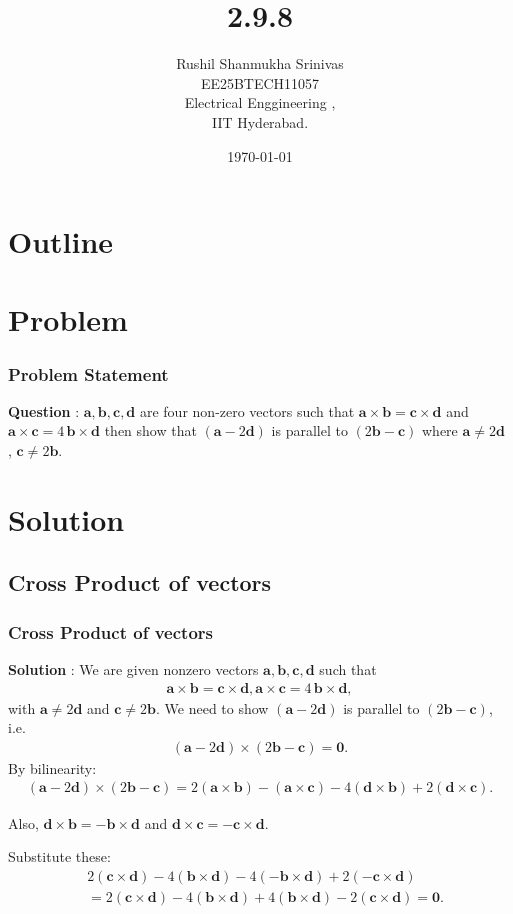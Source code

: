 \documentclass{beamer}
\title{2.9.8}
\author{Rushil Shanmukha Srinivas \\EE25BTECH11057 \\ Electrical Enggineering ,\\IIT Hyderabad.}
\date{\today}
\theoremstyle{remark}
\let\vec\mathbf
\numberwithin{equation}{section}
\begin{document}
 

\begin{frame}
\titlepage
\end{frame}

\section*{Outline}
\begin{frame}
\tableofcontents
\end{frame}
\section{Problem}
\begin{frame}
\frametitle{Problem Statement}
\textbf{Question} : $\vec a,\vec b,\vec c ,\vec d $ are four non-zero vectors such that
$\vec a \times \vec b = \vec c \times \vec d$ and $ \vec a \times \vec c = 4\,\vec b \times \vec d$
then show that $(\vec a - 2\vec d)$ is parallel to $(2\vec b - \vec c)$ where $\vec a \neq 2\vec d $ , $\vec c \neq 2\vec b.$
\end{frame}
\section{Solution}
\subsection{Cross Product of vectors}
\begin{frame}
\frametitle{Cross Product of vectors}
\textbf{Solution} :
We are given nonzero vectors $\vec a,\vec b,\vec c,\vec d $ such that
\begin{align}
\vec a\times \vec b = \vec c\times \vec d,
\vec a\times \vec c = 4\,\vec b\times \vec d,
\end{align}
with $\vec a\neq 2\vec d$ and $\vec c\neq 2\vec b$.
We need to show $(\vec a- 2\vec d)$ is parallel to $(2\vec b-\vec c)$, i.e.
\begin{align}
(\mathbf a-2\mathbf d)\times(2\mathbf b-\mathbf c)=\mathbf0.
\end{align}
By bilinearity:
\begin{align}
(\vec a-2\vec d)\times(2\vec b-\vec c)
= 2(\vec a\times\vec b) - (\vec a\times\vec c)
 - 4(\vec d\times\vec b) + 2(\vec d\times\vec c).
\end{align}

Also, $\vec d\times\vec b=-\vec b\times\vec d$ and
$\vec d\times\vec c=-\vec c\times\vec d$.

Substitute these:
\begin{align}
&2(\vec c\times\vec d) - 4(\vec b\times\vec d)
   -4(-\vec b\times\vec d) + 2(-\vec c\times\vec d) \\
&= 2(\vec c\times\vec d) - 4(\vec b\times\vec d)
   + 4(\vec b\times\vec d) - 2(\vec c\times\vec d) = \vec 0.
\end{align}
\end{frame}
\end{document}
